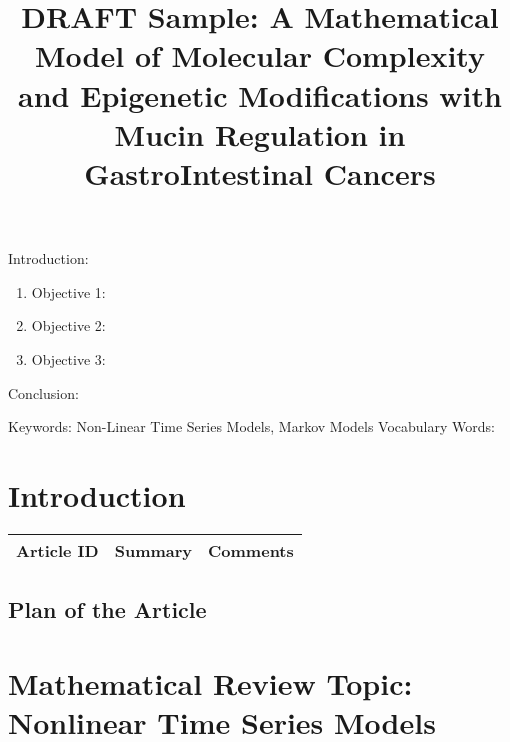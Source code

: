 


\twocolumn
\scriptsize
\begin{frontmatter}
		\title{DRAFT Sample: A Mathematical Model of Molecular Complexity and Epigenetic Modifications with Mucin Regulation in GastroIntestinal Cancers}
		\author{}
		\address{The Mathematical Learning Space}
\end{frontmatter}	

Introduction:
\begin{enumerate}
\item Objective 1:
\item Objective 2:
\item Objective 3:
\end{enumerate}
Conclusion:

Keywords: Non-Linear Time Series Models, Markov Models
Vocabulary Words:

\section{Introduction}

\begin{table}[H]\centering
	\begin{tabular}{p{1cm}p{4cm}p{3cm}}
		Article ID & Summary & Comments\\
		\hline
		\hline
	\end{tabular}
\end{table}


\subsection{Plan of the Article}

\begin{enumerate}
\end{enumerate}


\section{Mathematical Review Topic: Nonlinear Time Series Models}

